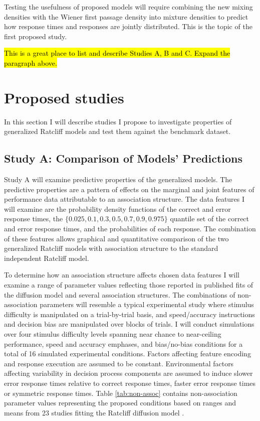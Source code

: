 \documentclass[12pt]{article}
\newcommand{\trish}[1]{\textrm{\hl{#1}}}
\begin{document}
Testing the usefulness of proposed models will require combining the
new mixing densities with the Wiener first passage density into
mixture densities to predict how response times and responses are
jointly distributed. This is the topic of the first proposed study.

\trish{This is a great place to list and describe Studies A, B and C.
Expand the paragraph above.}

\section{Proposed studies}

In this section I will describe studies I propose to investigate properties of generalized Ratcliff models and test them against the benchmark dataset.

\subsection{Study A: Comparison of Models' Predictions}

Study A will examine predictive properties of the
generalized models. The predictive properties are a pattern of
effects on the marginal and joint features of performance data
attributable to an association structure. The data features I will
examine are the probability density functions of the correct and error
response times, the $\{0.025, 0.1, 0.3, 0.5, 0.7, 0.9, 0.975\}$
quantile set of the correct and error response times, and the
probabilities of each response. The combination of these features allows graphical and
quantitative comparison of the two generalized Ratcliff
models with association structure to the standard
independent Ratcliff model.

To determine how an association structure affects
chosen data features I will examine a range of parameter values reflecting those reported in
published fits of the diffusion model and \citep{MatWag2009}
several association structures. The combinations of
non-association parameters will resemble a typical experimental study
where stimulus difficulty is manipulated on a trial-by-trial
basis, and speed/accuracy instructions and decision bias are
manipulated over blocks of trials. I will conduct
simulations over four stimulus difficulty levels spanning near
chance to near-ceiling performance, speed and accuracy emphases, and
bias/no-bias conditions for a total of 16 simulated experimental
conditions. Factors affecting feature encoding and response execution
are assumed to be constant. Environmental factors affecting
variability in decision process components are assumed to induce
slower error response times relative to correct response times, faster
error response times or symmetric response times. Table  \ref{tab:non-assoc}
contains non-association parameter values representing the proposed
conditions based on ranges and means from 23 studies fitting the
Ratcliff diffusion model \citep{MatWag2009}.
    
\end{document}
